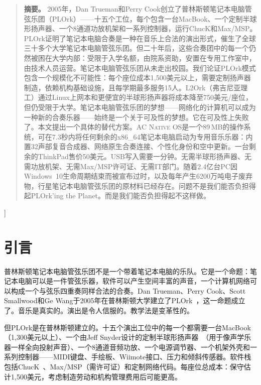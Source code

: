 \documentclass[10pt,letterpaper,twocolumn]{article}
\newcommand{\acos}{\textsc{AC Native OS}}
\begin{document}
{\begin{quote}
\small\noindent\textbf{摘要。}
2005年，Dan Trueman和Perry Cook创立了普林斯顿笔记本电脑管弦乐团（PLOrk）——十五个工位，每个包含一台MacBook、一个定制半球形扬声器、一个8通道功放机架和一系列控制器，运行ChucK和Max/MSP。PLOrk证明了笔记本电脑合奏是一种在音乐上合法的演出形式，催生了全球三十多个大学笔记本电脑管弦乐团。但二十年后，这些合奏团中的每一个仍然被困在大学内部：受限于入学名额，由院系资助，安置在专用工作室中，由技术人员运营。笔记本电脑管弦乐团从未走出校园。我们论证PLOrk模式包含一个规模化不可能性：每个座位成本1,500美元以上，需要定制扬声器制造，依赖机构基础设施，且每学期最多服务15人。L2Ork（弗吉尼亚理工）通过Linux上网本和更便宜的半球形扬声器将成本降至750美元/座位，但仍受限于大学。笔记本电脑管弦乐团的梦想——网络化的计算机可以成为一种新的合奏乐器——始终是一个关于可及性的梦想。它在可及性上失败了。本文提出一个具体的替代方案。\acos{}是一个89\,MB的操作系统，可在7.3秒内将任何剩余的x86\_64笔记本电脑启动为专用音乐乐器：内置32声部复音合成器、网络原生合奏连接、个性化身份和空中更新。一台剩余的ThinkPad售价50美元。USB写入需要一分钟。无需半球形扬声器、无需功放机架、无需Max/MSP许可证、无需IT部门。随着2.4亿台PC因Windows~10生命周期结束而被宣布过时，以及每年产生6200万吨电子废弃物，行星笔记本电脑管弦乐团的原材料已经存在。问题不是我们能否负担得起PLOrk'ing the Planet。而是我们能否负担得起不这样做。
\end{quote}
\vspace{0.5em}
}]


\section{引言}

普林斯顿笔记本电脑管弦乐团不是一个带着笔记本电脑的乐队。它是一个命题：笔记本电脑可以是一件管弦乐器，软件可以产生空间丰富的声音，一个计算机网络可以构成一个与弦乐四重奏同样合法的合奏。Dan Trueman、Perry Cook、Scott Smallwood和Ge Wang于2005年在普林斯顿大学建立了PLOrk~\citep{trueman2006plork, trueman2007why}，这一命题成立了。音乐是真实的。演出是令人信服的。教学法是变革性的。

但PLOrk是在普林斯顿建立的。十五个演出工位中的每一个都需要一台MacBook（1,300美元以上）、一个由Jeff Snyder设计的定制半球形扬声器~\citep{snyder2015hemispherical}（用于像声学乐器一样全向投射声音）、一个8通道音频功放、一个电源调节器、一个机架外壳和一系列控制器——MIDI键盘、手绘板、Wiimote接口、压力和倾斜传感器。软件栈包括ChucK~\citep{wang2003chuck}、Max/MSP（需许可证）和定制网络代码。每座位总成本：保守估计1,500美元，考虑制造劳动和机构管理费用后可能更高。
\end{document}
